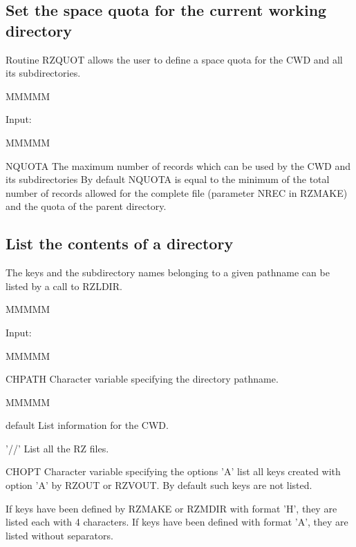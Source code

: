 \subsection{Set the space quota for the current working directory}
\par Routine RZQUOT allows the user to define a
space quota for the CWD and all its subdirectories.
\begin{DL}{MMMMM}
\item[Input:
]
\begin{DL}{MMMMM}
\item[NQUOTA
]The maximum number of records which can be used by the CWD and its
subdirectories
\newline By default NQUOTA is equal to the minimum of the total number of
records allowed for the complete file (parameter NREC in RZMAKE) and
the quota of the parent directory.
\end{DL}
\end{DL}
\subsection{List the contents of a directory}
\par The keys and the subdirectory names belonging to a given pathname can
be listed by a call to RZLDIR.
\begin{DL}{MMMMM}
\item[Input:
]
\begin{DL}{MMMMM}
\item[CHPATH
]Character variable specifying the directory pathname.
\begin{DL}{MMMMM}
\item[default
]List information for the CWD.
\item['//'
]List all the RZ files.
\end{DL}
\item[CHOPT
]Character variable specifying the options
\newline 'A' list all keys created with option 'A' by RZOUT or RZVOUT.
\newline By default such keys are not listed.
\end{DL}
\end{DL}
\par If keys have been defined by RZMAKE or RZMDIR with format 'H',
they are listed each with 4 characters. If keys have been defined
with format 'A', they are listed without separators.
